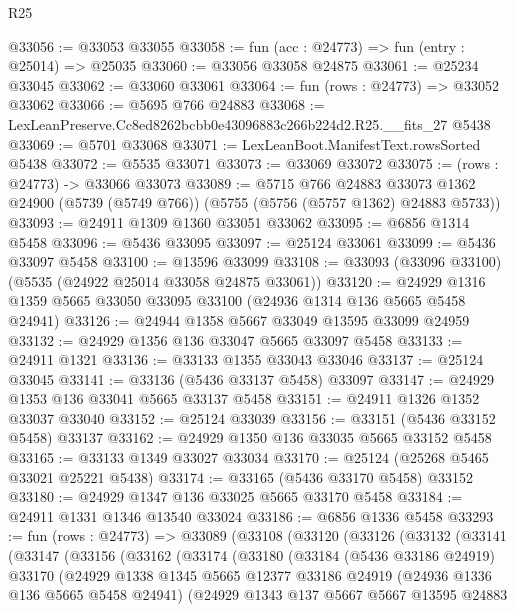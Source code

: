 \begin{lexlean}{R25}
\begin{coremodule}
@33056 := @33053 @33055
@33058 := fun (acc : @24773) => fun (entry : @25014) => @25035
@33060 := @33056 @33058 @24875
@33061 := @25234 @33045
@33062 := @33060 @33061
@33064 := fun (rows : @24773) => @33052 @33062
@33066 := @5695 @766 @24883
@33068 := LexLeanPreserve.Cc8ed8262bcbb0e43096883c266b224d2.R25.__fits_27 @5438
@33069 := @5701 @33068
@33071 := LexLeanBoot.ManifestText.rowsSorted @5438
@33072 := @5535 @33071
@33073 := @33069 @33072
@33075 := (rows : @24773) -> @33066 @33073
@33089 := @5715
    @766
    @24883
    @33073
    @1362
    @24900
    (@5739 (@5749 @766))
    (@5755 (@5756 (@5757 @1362) @24883 @5733))
@33093 := @24911 @1309 @1360 @33051 @33062
@33095 := @6856 @1314 @5458
@33096 := @5436 @33095
@33097 := @25124 @33061
@33099 := @5436 @33097 @5458
@33100 := @13596 @33099
@33108 := @33093 (@33096 @33100) (@5535 (@24922 @25014 @33058 @24875 @33061))
@33120 := @24929 @1316 @1359 @5665 @33050 @33095 @33100 (@24936 @1314 @136 @5665 @5458 @24941)
@33126 := @24944 @1358 @5667 @33049 @13595 @33099 @24959
@33132 := @24929 @1356 @136 @33047 @5665 @33097 @5458
@33133 := @24911 @1321
@33136 := @33133 @1355 @33043 @33046
@33137 := @25124 @33045
@33141 := @33136 (@5436 @33137 @5458) @33097
@33147 := @24929 @1353 @136 @33041 @5665 @33137 @5458
@33151 := @24911 @1326 @1352 @33037 @33040
@33152 := @25124 @33039
@33156 := @33151 (@5436 @33152 @5458) @33137
@33162 := @24929 @1350 @136 @33035 @5665 @33152 @5458
@33165 := @33133 @1349 @33027 @33034
@33170 := @25124 (@25268 @5465 @33021 @25221 @5438)
@33174 := @33165 (@5436 @33170 @5458) @33152
@33180 := @24929 @1347 @136 @33025 @5665 @33170 @5458
@33184 := @24911 @1331 @1346 @13540 @33024
@33186 := @6856 @1336 @5458
@33293 := fun (rows : @24773) =>
  @33089
    (@33108
      (@33120
        (@33126
          (@33132
            (@33141
              (@33147
                (@33156
                  (@33162
                    (@33174
                      (@33180
                        (@33184
                          (@5436 @33186 @24919)
                          @33170
                          (@24929
                            @1338
                            @1345
                            @5665
                            @12377
                            @33186
                            @24919
                            (@24936 @1336 @136 @5665 @5458 @24941)
                            (@24929
                              @1343
                              @137
                              @5667
                              @5667
                              @13595
                              @24883

\end{coremodule}
\end{lexlean}
